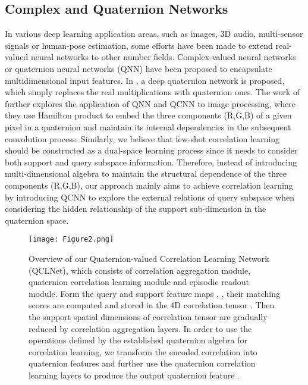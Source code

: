 \documentclass[lettersize,journal]{IEEEtran}
\begin{document}
\subsection{Complex and Quaternion Networks}
In various deep learning application areas\cite{RN60,RN61,RN62}, such as images, 3D audio, multi-sensor signals or human-pose estimation, some efforts have been made to extend real-valued neural networks to other number fields. Complex-valued neural networks\cite{RN63} or quaternion neural networks \cite{RN60, RN26, RN27, RN28} (QNN) have been proposed to encapsulate multidimensional input features. In \cite{RN26}, a deep quaternion network is proposed, which simply replaces the real multiplications with quaternion ones. The work of \cite{RN27, RN29} further explores the application of QNN and QCNN to image processing, where they use Hamilton product to embed the three components (R,G,B) of a given pixel in a quaternion and maintain its internal dependencies in the subsequent convolution process. Similarly, we believe that few-shot correlation learning should be constructed as a dual-space learning process since it needs to consider both support and query subspace information. Therefore, instead of introducing multi-dimensional algebra to maintain the structural dependence of the three components (R,G,B), our approach mainly aims to achieve correlation learning by introducing QCNN to explore the external relations of query subspace when considering the hidden relationship of the support sub-dimension in the quaternion space.



\begin{figure*}
\centering
\texttt{[image: Figure2.png]}
\caption{Overview of our Quaternion-valued Correlation Learning Network (QCLNet), which consists of correlation aggregation module, quaternion correlation learning module and episodic readout module. Form the query and support feature maps , , their matching scores are computed and stored in the 4D correlation tensor . Then the support spatial dimensions of correlation tensor are gradually reduced by correlation aggregation layers. In order to use the operations defined by the established quaternion algebra for correlation learning, we transform the encoded correlation  into quaternion features  and further use the quaternion correlation learning layers to produce the output quaternion feature .
\label{Figure2}}
\end{figure*}
\end{document}
